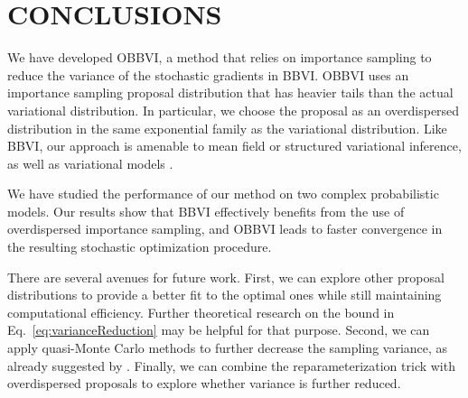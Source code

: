 \documentclass[]{article}
\begin{document}
\section{CONCLUSIONS}\label{sec:conclusions}
\glsresetall
We have developed \gls{OBBVI}, a method that relies on importance sampling
to reduce the variance of the stochastic gradients in \gls{BBVI}.
\gls{OBBVI} uses an importance sampling proposal distribution that has
heavier tails than the actual variational distribution.
In particular, we choose the proposal as an overdispersed distribution
in the same exponential family as the variational distribution.
Like \gls{BBVI}, our approach is amenable to
mean field or structured variational inference, as well as
variational models \citep{Ranganath2015_hvm,Tran2016}.

We have studied the performance of our method on two complex probabilistic models. Our results show that \gls{BBVI} effectively benefits from the use of overdispersed importance sampling, and \gls{OBBVI} leads to faster convergence in the resulting stochastic optimization procedure.

There are several avenues for future work. First, we can explore other proposal distributions to provide a better fit to the optimal ones while still maintaining computational efficiency. Further theoretical research on the bound in Eq.~\ref{eq:varianceReduction} may be helpful for that purpose. Second, we can apply quasi-Monte Carlo methods to further decrease the sampling variance, as already suggested by \citet{Ranganath2014}. Finally, we can combine the reparameterization trick with overdispersed proposals to explore whether variance is further reduced.


\end{document}
